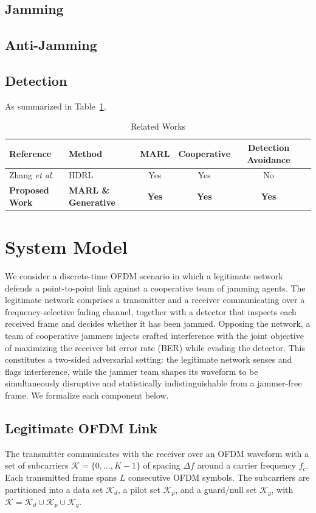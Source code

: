 \documentclass[journal]{IEEEtran}
\newcommand{\rar}[1]{{\color{blue}{[#1]}}}
\begin{document}
\subsection{Jamming}
\subsection{Anti-Jamming}
\subsection{Detection}
As summarized in Table~\ref{tab:related_works}, \rar{and so on...}
\begin{table}[!t]
\renewcommand{\arraystretch}{1.3}
\caption{Related Works} %
\label{tab:related_works}
\centering
\begin{tabular}{l l c c c l}
\hline\hline %
\textbf{Reference} & \textbf{Method} & \textbf{MARL} & \textbf{Cooperative} & \textbf{Detection Avoidance} \\ %
\hline
Zhang \emph{et al.} \cite{article} & HDRL & Yes & Yes & No \\ %
\textbf{Proposed Work} & \textbf{MARL \& Generative} & \textbf{Yes} & \textbf{Yes} & \textbf{Yes} \\ %
\hline\hline %
\end{tabular}
\end{table}


\section{System Model}
We consider a discrete-time OFDM scenario in which a legitimate network defends a point-to-point link against a cooperative team of jamming agents. 
The legitimate network comprises a transmitter and a receiver communicating over a frequency-selective fading channel, together with a detector that inspects each received frame and decides whether it has been jammed.
Opposing the network, a team of cooperative jammers injects crafted interference with the joint objective of maximizing the receiver bit error rate (BER) while evading the detector.
This constitutes a two-sided adversarial setting: the legitimate network senses and flags interference, while the jammer team shapes its waveform to be simultaneously disruptive and statistically indistinguishable from a jammer-free frame. We formalize each component below.

\subsection{Legitimate OFDM Link}
The transmitter communicates with the receiver over an OFDM waveform with a set of subcarriers $\mathcal{K} = \{0, \ldots, K-1\}$ of spacing $\Delta f$ around a carrier frequency $f_c$.
Each transmitted frame spans $L$ consecutive OFDM symbols.
The subcarriers are partitioned into a data set $\mathcal{K}_d$, a pilot set $\mathcal{K}_p$, and a guard/null set $\mathcal{K}_g$, with $\mathcal{K} = \mathcal{K}_d \cup \mathcal{K}_p \cup \mathcal{K}_g$.
\end{document}
